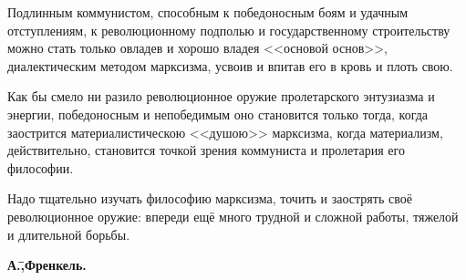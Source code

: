 Подлинным коммунистом, способным к победоносным боям и удачным отступлениям, к революционному подполью и государственному строительству можно стать только овладев и хорошо владея <<основой основ>>, диалектическим методом марксизма, усвоив и впитав его в кровь и плоть свою.

Как бы смело ни разило революционное оружие пролетарского энтузиазма и энергии, победоносным и непобедимым оно становится только тогда, когда заострится материалистическою <<душою>> марксизма, когда материализм, действительно, становится точкой зрения коммуниста и пролетария его философии.

Надо тщательно изучать философию марксизма, точить и заострять своё революционное оружие: впереди ещё много трудной и сложной работы, тяжелой и длительной борьбы.

\begin{flushright}
 \textbf{А.\=,Френкель.}\hspace*{2em}
\end{flushright}
